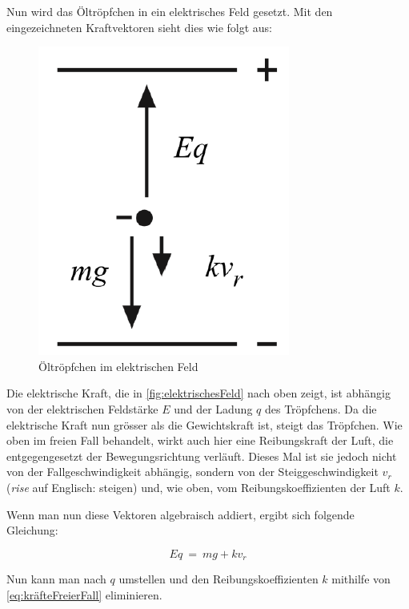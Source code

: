 \noindent Nun wird das Öltröpfchen in ein elektrisches Feld gesetzt. Mit den eingezeichneten Kraftvektoren sieht dies wie folgt aus:

\begin{figure}[h]
	\begin{center}
		\includegraphics[scale=0.5]{bilder/pdf/Abbildung2_elektrischesFeld.pdf}
		\caption{Öltröpfchen im elektrischen Feld \parencite[1]{instructionManualHalogen}}
		\label{fig:elektrischesFeld}
	\end{center}
\end{figure}

\noindent Die elektrische Kraft, die in \autoref{fig:elektrischesFeld} nach oben zeigt, ist abhängig von der elektrischen Feldstärke $E$ und der Ladung $q$ des Tröpfchens. Da die elektrische Kraft nun grösser als die Gewichtskraft ist, steigt das Tröpfchen. Wie oben im freien Fall behandelt, wirkt auch hier eine Reibungskraft der Luft, die entgegengesetzt der Bewegungsrichtung verläuft. Dieses Mal ist sie jedoch nicht von der Fallgeschwindigkeit abhängig, sondern von der Steiggeschwindigkeit $v_r$ (\textit{rise} auf Englisch: steigen) und, wie oben, vom Reibungskoeffizienten der Luft $k$.

Wenn man nun diese Vektoren algebraisch addiert, ergibt sich folgende Gleichung:

\begin{equation}\label{eq:elektrischesFeld}
	Eq \ = \ mg + kv_r
\end{equation}

\noindent Nun kann man nach $q$ umstellen und den Reibungskoeffizienten $k$ mithilfe von \autoref{eq:kräfteFreierFall} eliminieren. 

